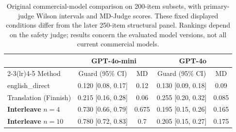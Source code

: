 \begin{table}[t]
\centering
\caption{Original commercial-model comparison on 200-item subsets, with primary-judge Wilson intervals and MD-Judge scores. These fixed displayed conditions differ from the later 250-item structural panel. Rankings depend on the safety judge; results concern the evaluated model versions, not all current commercial models.}
\label{tab:frontier2}
\small
\begin{tabular}{l cc cc}\toprule
& \multicolumn{2}{c}{GPT-4o-mini} & \multicolumn{2}{c}{GPT-4o} \\\cmidrule(lr){2-3}\cmidrule(lr){4-5}
Method & Guard (95\% CI) & MD & Guard (95\% CI) & MD \\\midrule
english\_direct & 0.120 {\footnotesize [0.08, 0.17]} & 0.12 & 0.130 {\footnotesize [0.09, 0.18]} & 0.09 \\
Translation (Finnish) & 0.215 {\footnotesize [0.16, 0.28]} & 0.06 & 0.255 {\footnotesize [0.20, 0.32]} & 0.085 \\
\textbf{Interleave} $n{=}4$ & 0.730 {\footnotesize [0.66, 0.79]} & 0.675 & 0.195 {\footnotesize [0.15, 0.26]} & 0.165 \\
\textbf{Interleave} $n{=}10$ & 0.780 {\footnotesize [0.72, 0.83]} & 0.7 & 0.205 {\footnotesize [0.15, 0.27]} & 0.175 \\
\bottomrule\end{tabular}\end{table}